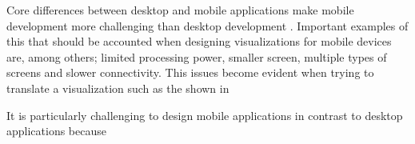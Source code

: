 Core differences between desktop and mobile applications make mobile development more challenging than desktop development \cite{Chittaro2006}. Important examples of this that should be accounted when designing visualizations for mobile devices are, among others; limited processing power, smaller screen, multiple types of screens and slower connectivity. This issues become evident when trying to translate a visualization such as the shown in 

It is particularly challenging to design mobile applications in contrast to desktop applications because 






